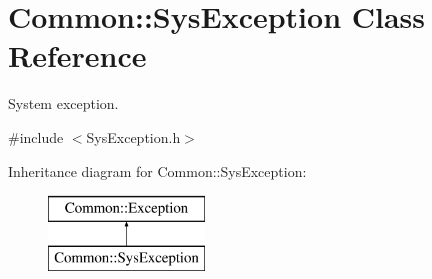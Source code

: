 \hypertarget{class_common_1_1_sys_exception}{\section{Common\-:\-:Sys\-Exception Class Reference}
\label{class_common_1_1_sys_exception}
}


System exception.  




{\ttfamily \#include $<$Sys\-Exception.\-h$>$}

Inheritance diagram for Common\-:\-:Sys\-Exception\-:\begin{figure}[H]
\begin{center}
\leavevmode
\includegraphics[height=2.000000cm]{class_common_1_1_sys_exception}
\end{center}
\end{figure}
